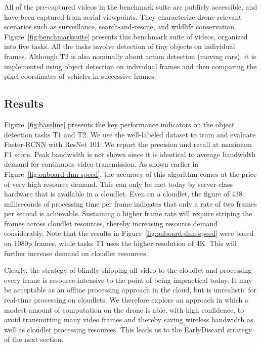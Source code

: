 All of the pre-captured videos in the benchmark suite are publicly accessible,
and have been captured from aerial viewpoints. They characterize drone-relevant
scenarios such as surveillance, search-and-rescue, and wildlife conservation.
Figure~\ref{fig:benchmarksuite} presents this benchmark suite of videos,
organized into five tasks. All the tasks involve detection of tiny objects on
individual frames. Although T2 is also nominally about action detection (moving
cars), it is implemented using object detection on individual frames and then
comparing the pixel coordinates of vehicles in successive frames.

\subsection{Results}
\label{sec:dumbdrone-results}

Figure~\ref{fig:baseline} presents the key performance indicators on the object
detection tasks T1 and T2. We use the well-labeled dataset to train and evaluate
Faster-RCNN with ResNet 101. We report the precision and recall at maximum F1
score.  Peak bandwidth is not shown since it is identical to average bandwidth
demand for continuous video transmission.  As shown earlier in
Figure~\ref{fig:onboard-dnn-speed}, the accuracy of this algorithm comes at the
price of very high resource demand.  This can only be met today by server-class
hardware that is available in a cloudlet.  Even on a cloudlet, the figure of 438
milliseconds of processing time per frame indicates that only a rate of two
frames per second is achievable.  Sustaining a higher frame rate will require
striping the frames across cloudlet resources, thereby increasing resource
demand considerably.  Note that the results in
Figure~\ref{fig:onboard-dnn-speed} were based on 1080p frames, while tasks T1
uses the higher resolution of 4K. This will further increase demand on cloudlet
resources.

Clearly, the strategy of blindly shipping all video to the cloudlet
and processing every frame is resource-intensive to the point of being
impractical today.  It may be acceptable as an offline processing
approach in the cloud, but is unrealistic for real-time processing on
cloudlets.  We therefore explore an approach in which a modest amount
of computation on the drone is able, with high confidence, to avoid
transmitting many video frames and thereby saving wireless bandwidth
as well as cloudlet processing resources.  This leads us to the {\xc
  EarlyDiscard} strategy of the next section.



